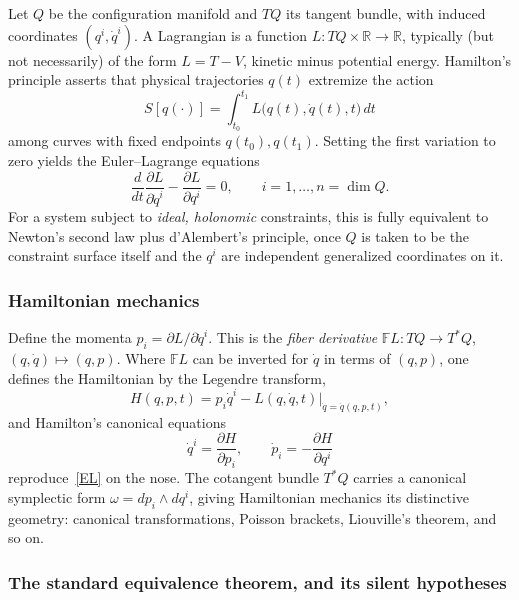 Let $Q$ be the configuration manifold and $TQ$ its tangent bundle, with induced
coordinates $(q^i,\dot q^i)$. A Lagrangian is a function $L : TQ \times
\mathbb{R} \to \mathbb{R}$, typically (but not necessarily) of the form $L = T
- V$, kinetic minus potential energy. Hamilton's principle asserts that
physical trajectories $q(t)$ extremize the action
\begin{equation}
S[q(\cdot)] = \int_{t_0}^{t_1} L\big(q(t),\dot q(t), t\big)\, dt
\end{equation}
among curves with fixed endpoints $q(t_0), q(t_1)$. Setting the first variation
to zero yields the Euler--Lagrange equations
\begin{equation}
\label{EL}
\frac{d}{dt}\frac{\partial L}{\partial\dot q^i} - \frac{\partial L}{\partial q^i} = 0 ,
    \qquad i = 1,\dots,n=\dim Q .
\end{equation}
For a system subject to \emph{ideal, holonomic} constraints, this is fully
equivalent to Newton's second law plus d'Alembert's principle, once $Q$ is
taken to be the constraint surface itself and the $q^i$ are independent
generalized coordinates on it.

\subsubsection{Hamiltonian mechanics}

Define the momenta $p_i = \partial L/\partial \dot q^i$. This is the
\emph{fiber derivative} $\mathbb{F}L: TQ \to T^*Q$, $(q,\dot q)\mapsto (q,p)$.
Where $\mathbb{F}L$ can be inverted for $\dot q$ in terms of $(q,p)$, one
defines the Hamiltonian by the Legendre transform,
\begin{equation}
H(q,p,t) = p_i \dot q^i - L(q,\dot q, t)\Big|_{\dot q = \dot q(q,p,t)} ,
\end{equation}
and Hamilton's canonical equations
\begin{equation}
\label{Ham}
\dot q^i = \frac{\partial H}{\partial p_i}, \qquad 
    \dot p_i = -\frac{\partial H}{\partial q^i}
\end{equation}
reproduce~\eqref{EL} on the nose. The cotangent bundle $T^*Q$ carries a
canonical symplectic form $\omega = dp_i \wedge dq^i$, giving Hamiltonian
mechanics its distinctive geometry: canonical transformations, Poisson
brackets, Liouville's theorem, and so on.

\subsubsection{The standard equivalence theorem, and its silent hypotheses}
\label{hypotheses}

